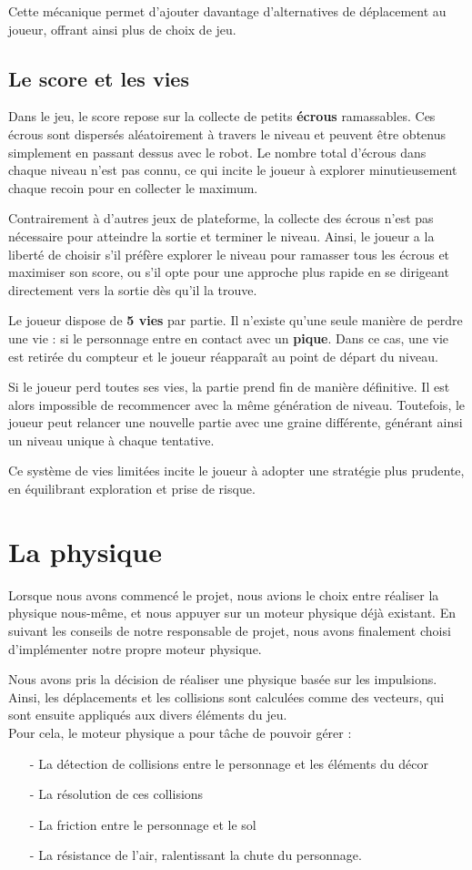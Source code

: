 \documentclass[10pt]{report}
\begin{document}
Cette mécanique permet d'ajouter davantage d'alternatives de déplacement au joueur, offrant ainsi plus de choix de jeu. 

\subsection{Le score et les vies}
Dans le jeu, le score repose sur la collecte de petits \textbf{écrous} ramassables. Ces écrous sont dispersés aléatoirement à travers le niveau et peuvent être obtenus simplement en passant dessus avec le robot. Le nombre total d'écrous dans chaque niveau n'est pas connu, ce qui incite le joueur à explorer minutieusement chaque recoin pour en collecter le maximum.

Contrairement à d'autres jeux de plateforme, la collecte des écrous n'est pas nécessaire pour atteindre la sortie et terminer le niveau. Ainsi, le joueur a la liberté de choisir s’il préfère explorer le niveau pour ramasser tous les écrous et maximiser son score, ou s’il opte pour une approche plus rapide en se dirigeant directement vers la sortie dès qu'il la trouve.

Le joueur dispose de \textbf{5 vies} par partie. Il n'existe qu'une seule manière de perdre une vie : si le personnage entre en contact avec un \textbf{pique}. Dans ce cas, une vie est retirée du compteur et le joueur réapparaît au point de départ du niveau.

Si le joueur perd toutes ses vies, la partie prend fin de manière définitive. Il est alors impossible de recommencer avec la même génération de niveau. Toutefois, le joueur peut relancer une nouvelle partie avec une graine différente, générant ainsi un niveau unique à chaque tentative.

Ce système de vies limitées incite le joueur à adopter une stratégie plus prudente, en équilibrant exploration et prise de risque. 

\section{La physique}
Lorsque nous avons commencé le projet, nous avions le choix entre réaliser la physique nous-même, et nous appuyer sur
un moteur physique déjà existant.
En suivant les conseils de notre responsable de projet, nous avons finalement choisi d'implémenter notre
propre moteur physique.

Nous avons pris la décision de réaliser une physique basée sur les impulsions.
Ainsi, les déplacements et les collisions sont calculées comme des vecteurs, qui sont ensuite appliqués aux
divers éléments du jeu.\\
Pour cela, le moteur physique a pour tâche de pouvoir gérer :
\begin{itemize}
  \item[-] La détection de collisions entre le personnage et les éléments du décor
  \item[-] La résolution de ces collisions
  \item[-] La friction entre le personnage et le sol
  \item[-] La résistance de l'air, ralentissant la chute du personnage.
\end{itemize}
\end{document}
